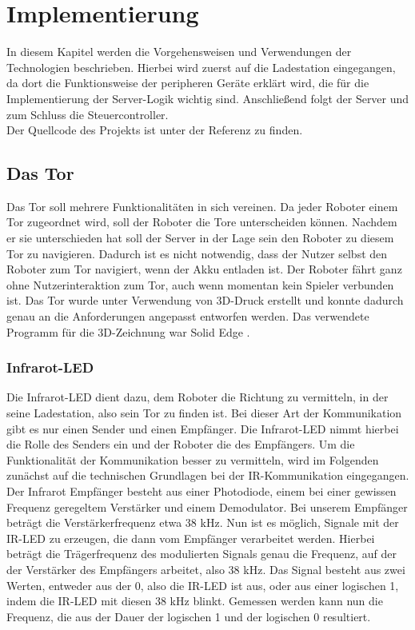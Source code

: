 \chapter{Implementierung}
\label{ch:implementierung}

In diesem Kapitel werden die Vorgehensweisen und Verwendungen der Technologien beschrieben. Hierbei wird zuerst auf die Ladestation eingegangen, da dort die Funktionsweise der peripheren Geräte erklärt wird, die für die Implementierung der Server-Logik wichtig sind. Anschließend folgt der Server und zum Schluss die Steuercontroller. \\
Der Quellcode des Projekts ist unter der Referenz \cite{PROJEKT} zu finden.


\section{Das Tor}
Das Tor soll mehrere Funktionalitäten in sich vereinen. Da jeder Roboter einem Tor zugeordnet wird, soll der Roboter die Tore unterscheiden können. Nachdem er sie unterschieden hat soll der Server in der Lage sein den Roboter zu diesem Tor zu navigieren. Dadurch ist es nicht notwendig, dass der Nutzer selbst den Roboter zum Tor navigiert, wenn der Akku entladen ist. Der Roboter fährt ganz ohne Nutzerinteraktion zum Tor, auch wenn momentan kein Spieler verbunden ist. Das Tor wurde unter Verwendung von 3D-Druck erstellt und konnte dadurch genau an die Anforderungen angepasst entworfen werden. Das verwendete Programm für die 3D-Zeichnung war Solid Edge \cite{SOLIDEDGE}.


\subsection{Infrarot-LED}
\label{sec:infrarot_led}
Die Infrarot-LED dient dazu, dem Roboter die Richtung zu vermitteln, in der seine Ladestation, also sein Tor zu finden ist. Bei dieser Art der Kommunikation gibt es nur einen Sender und einen Empfänger. Die Infrarot-LED nimmt hierbei die Rolle des Senders ein und der Roboter die des Empfängers. 
Um die Funktionalität der Kommunikation besser zu vermitteln, wird im Folgenden zunächst auf die technischen Grundlagen bei der IR-Kommunikation eingegangen.
Der Infrarot Empfänger besteht aus einer Photodiode, einem bei einer gewissen Frequenz geregeltem Verstärker und einem Demodulator. Bei unserem Empfänger beträgt die Verstärkerfrequenz etwa 38 kHz. Nun ist es möglich, Signale mit der IR-LED zu erzeugen, die dann vom Empfänger verarbeitet werden. Hierbei beträgt die Trägerfrequenz des modulierten Signals genau die Frequenz, auf der der Verstärker des Empfängers arbeitet, also 38 kHz. Das Signal besteht aus zwei Werten, entweder aus der 0, also die IR-LED ist aus, oder aus einer logischen 1, indem die IR-LED mit diesen 38 kHz blinkt. Gemessen werden kann nun die Frequenz, die aus der Dauer der logischen 1 und der logischen 0 resultiert. 

